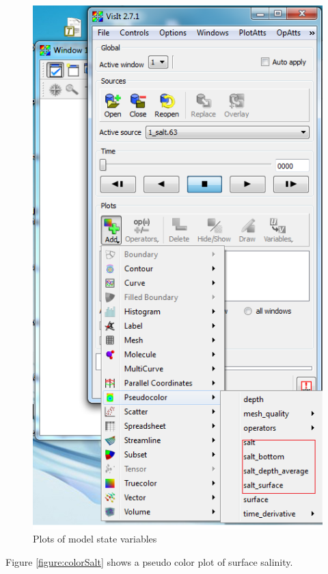 \documentclass[12pt]{report}
\begin{document}
        \begin{figure}
        \includegraphics{states}
        \caption{Plots of model state variables }
        \label{figure:states}
        \end{figure} 
   
		 Figure \ref{figure:colorSalt} shows a pseudo color plot of surface salinity.
     
\end{document}
